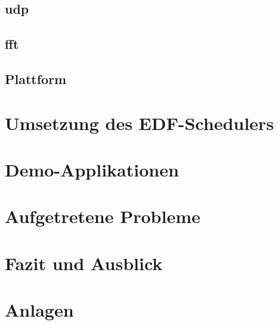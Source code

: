 \documentclass{scrartcl}
\begin{document}
		\subsection{\acf{udp}} \label{section:udp}
			
		\subsection{\acf{fft}} \label{section:fft}
			
		\clearpage
		\subsection{Plattform} \label{section:plattform}
			
	\clearpage
	\section{Umsetzung des EDF-Schedulers} \label{section:der_edf_scheduler}
		
	\clearpage
	\section{Demo-Applikationen} \label{section:demo_applikationen}
		
	\clearpage
	\section{Aufgetretene Probleme} \label{section:aufgetretene_probleme}
		
	\clearpage
	\section{Fazit und Ausblick} \label{section:fazit_und_ausblick}
		
	\clearpage
	\printbibliography{}
	\clearpage
	\section{Anlagen} \label{section:anlagen}
		
\end{document}
